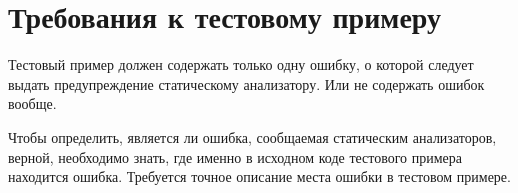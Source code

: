 \section{Требования к тестовому примеру}
Тестовый пример должен содержать только одну ошибку, о которой следует выдать предупреждение статическому анализатору. Или не содержать ошибок вообще.

Чтобы определить, является ли ошибка, сообщаемая статическим анализаторов, верной, необходимо знать, где именно в исходном коде тестового примера находится ошибка. Требуется точное описание места ошибки в тестовом примере. 




\FloatBarrier
